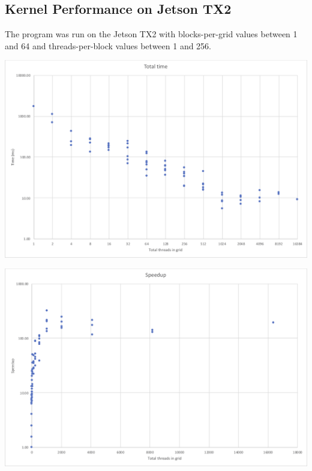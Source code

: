 \documentclass[a4paper,12pt]{article}
\begin{document}
\subsection{Kernel Performance on Jetson TX2}

The program was run on the Jetson TX2 with blocks-per-grid values between 1 and 64 and threads-per-block values between 1 and 256.

\begin{center}
  \includegraphics[width=\linewidth]{jetson-time}
\end{center}

\begin{center}
  \includegraphics[width=\linewidth]{jetson-speedup}
\end{center}
\end{document}

